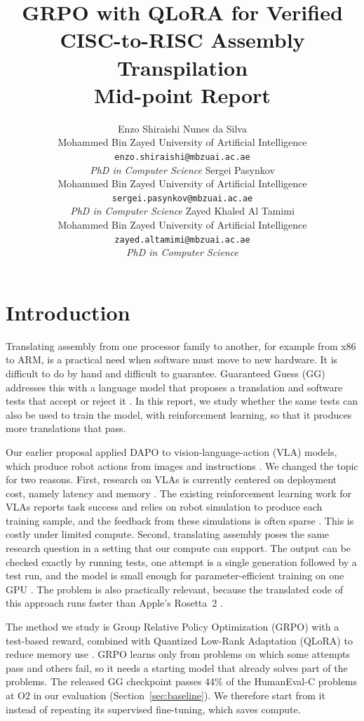\documentclass{article}
\title{GRPO with QLoRA for Verified CISC-to-RISC Assembly Transpilation\\\large Mid-point Report}
\author{%
  Enzo Shiraishi Nunes da Silva \\
  Mohammed Bin Zayed University of Artificial Intelligence \\
  \texttt{enzo.shiraishi@mbzuai.ac.ae} \\
  \textit{PhD in Computer Science}
  \And
  Sergei Pasynkov \\
  Mohammed Bin Zayed University of Artificial Intelligence \\
  \texttt{sergei.pasynkov@mbzuai.ac.ae} \\
  \textit{PhD in Computer Science}
  \And
  Zayed Khaled Al Tamimi \\
  Mohammed Bin Zayed University of Artificial Intelligence \\
  \texttt{zayed.altamimi@mbzuai.ac.ae} \\
  \textit{PhD in Computer Science}
}
\begin{document}
\maketitle

\section{Introduction}

Translating assembly from one processor family to another, for example from x86 to ARM, is a practical need when software must move to new hardware. It is difficult to do by hand and difficult to guarantee. Guaranteed Guess (GG) addresses this with a language model that proposes a translation and software tests that accept or reject it \citep{gg}. In this report, we study whether the same tests can also be used to train the model, with reinforcement learning, so that it produces more translations that pass.

Our earlier proposal applied DAPO to vision-language-action (VLA) models, which produce robot actions from images and instructions \citep{dapo}. We changed the topic for two reasons. First, research on VLAs is currently centered on deployment cost, namely latency and memory \citep{guan2025efficientvla,yu2025survey}. The existing reinforcement learning work for VLAs reports task success and relies on robot simulation to produce each training sample, and the feedback from these simulations is often sparse \citep{simplevlarl,vlarl,rlinfvla}. This is costly under limited compute. Second, translating assembly poses the same research question in a setting that our compute can support. The output can be checked exactly by running tests, one attempt is a single generation followed by a test run, and the model is small enough for parameter-efficient training on one GPU \citep{gg}. The problem is also practically relevant, because the translated code of this approach runs faster than Apple's Rosetta~2 \citep{gg}.

The method we study is Group Relative Policy Optimization (GRPO) with a test-based reward, combined with Quantized Low-Rank Adaptation (QLoRA) to reduce memory use \citep{deepseekmath,qlora}. GRPO learns only from problems on which some attempts pass and others fail, so it needs a starting model that already solves part of the problems. The released GG checkpoint passes 44\% of the HumanEval-C problems at O2 in our evaluation (Section~\ref{sec:baseline}). We therefore start from it instead of repeating its supervised fine-tuning, which saves compute.
\end{document}

